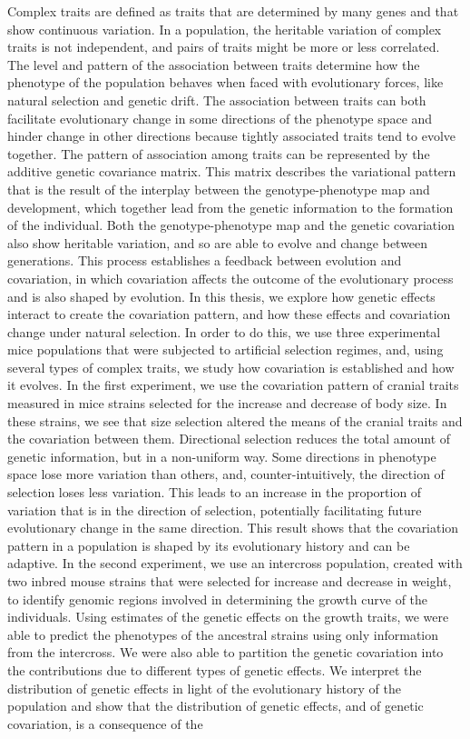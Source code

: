 \noindent
Complex traits are defined as traits that are determined by many genes and that show continuous variation. In a population, the heritable variation of complex traits is not independent, and pairs of traits might be more or less correlated. The level and pattern of the association between traits determine how the phenotype of the population behaves when faced with evolutionary forces, like natural selection and genetic drift. The association between traits can both facilitate evolutionary change in some directions of the phenotype space and hinder change in other directions because tightly associated traits tend to evolve together. The pattern of association among traits can be represented by the additive genetic covariance matrix. This matrix describes the variational pattern that is the result of the interplay between the genotype-phenotype map and development, which together lead from the genetic information to the formation of the individual. Both the genotype-phenotype map and the genetic covariation also show heritable variation, and so are able to evolve and change between generations. This process establishes a feedback between evolution and covariation, in which covariation affects the outcome of the evolutionary process and is also shaped by evolution. In this thesis, we explore how genetic effects interact to create the covariation pattern, and how these effects and covariation change under natural selection. In order to do this, we use three experimental mice populations that were subjected to artificial selection regimes, and, using several types of complex traits, we study how covariation is established and how it evolves. In the first experiment, we use the covariation pattern of cranial traits measured in mice strains selected for the increase and decrease of body size. In these strains, we see that size selection altered the means of the cranial traits and the covariation between them. Directional selection reduces the total amount of genetic information, but in a non-uniform way. Some directions in phenotype space lose more variation than others, and, counter-intuitively, the direction of selection loses less variation. This leads to an increase in the proportion of variation that is in the direction of selection, potentially facilitating future evolutionary change in the same direction. This result shows that the covariation pattern in a population is shaped by its evolutionary history and can be adaptive. In the second experiment, we use an intercross population, created with two inbred mouse strains that were selected for increase and decrease in weight, to identify genomic regions involved in determining the growth curve of the individuals. Using estimates of the genetic effects on the growth traits, we were able to predict the phenotypes of the ancestral strains using only information from the intercross. We were also able to partition the genetic covariation into the contributions due to different types of genetic effects. We interpret the distribution of genetic effects in light of the evolutionary history of the population and show that the distribution of genetic effects, and of genetic covariation, is a consequence of the 